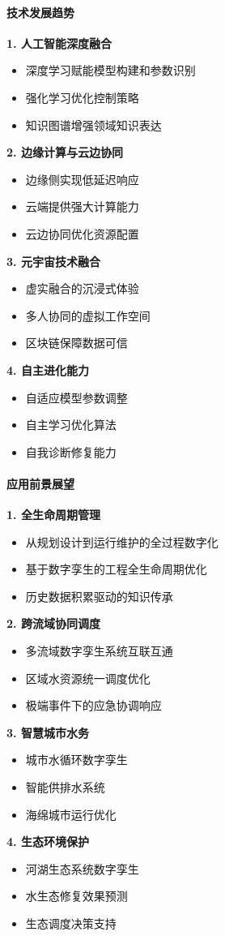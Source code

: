 {{{{{{{{{{\paragraph{技术发展趋势}\label{ux6280ux672fux53d1ux5c55ux8d8bux52bf} \textbf{1. 人工智能深度融合} \begin{itemize} \tightlist \item
深度学习赋能模型构建和参数识别 \item 强化学习优化控制策略 \item 知识图谱增强领域知识表达 \end{itemize} \textbf{2. 边缘计算与云边协同} \begin{itemize} \tightlist \item
边缘侧实现低延迟响应 \item 云端提供强大计算能力 \item 云边协同优化资源配置 \end{itemize} \textbf{3. 元宇宙技术融合} \begin{itemize} \tightlist \item
虚实融合的沉浸式体验 \item 多人协同的虚拟工作空间 \item 区块链保障数据可信 \end{itemize} \textbf{4. 自主进化能力} \begin{itemize} \tightlist \item 自适应模型参数调整
\item 自主学习优化算法 \item 自我诊断修复能力 \end{itemize} \paragraph{应用前景展望}\label{ux5e94ux7528ux524dux666fux5c55ux671b} \textbf{1.
全生命周期管理} \begin{itemize} \tightlist \item 从规划设计到运行维护的全过程数字化 \item 基于数字孪生的工程全生命周期优化 \item 历史数据积累驱动的知识传承 \end{itemize}
\textbf{2. 跨流域协同调度} \begin{itemize} \tightlist \item 多流域数字孪生系统互联互通 \item 区域水资源统一调度优化 \item 极端事件下的应急协调响应 \end{itemize}
\textbf{3. 智慧城市水务} \begin{itemize} \tightlist \item 城市水循环数字孪生 \item 智能供排水系统 \item 海绵城市运行优化 \end{itemize} \textbf{4.
生态环境保护} \begin{itemize} \tightlist \item 河湖生态系统数字孪生 \item 水生态修复效果预测 \item 生态调度决策支持 \end{itemize}
}}}}}}}}}}
